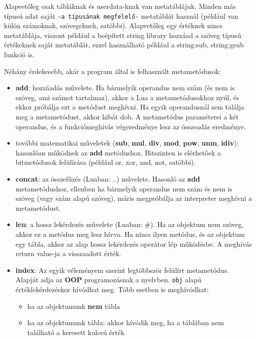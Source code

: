 Alapvetőleg csak tábláknak és userdata-knak van metatáblájuk. Minden más típusú adat saját \texttt{-a típusának megfelelő-} metatáblát használ (például van külön számoknak, szövegeknek, satöbbi). Alapvetőleg egy értéknek nincs metatáblája, viszont például a beépített string library hozzáad a szöveg típusú értékeknek saját metatáblát, ezzel használható például a string:sub, string:gsub funkció is.

Néhány érdekesebb, akár a program által is felhasznált metametódusok:
\begin{itemize}
	\item \detokenize{__}\textbf{add}: hozzáadás művelete. Ha bármelyik operandus nem szám (és nem is szöveg, ami számot tartalmaz), akkor a Lua a metametódusokhoz nyúl, és ekkor próbálja ezt a metódust meghívni. Ha egyik operandusnál sem találja meg a metametódust, akkor hibát dob. A metametódus paraméterei a két operandus, és a funkciómeghívás végeredménye lesz az összeadás eredménye.
	\item további matematikai műveletek (\detokenize{__}\textbf{sub}, \detokenize{__}\textbf{mul}, \detokenize{__}\textbf{div}, \detokenize{__}\textbf{mod}, \detokenize{__}\textbf{pow}, \detokenize{__}\textbf{unm}, \detokenize{__}\textbf{idiv}): hasonlóan működnek az \detokenize{__}\textbf{add} metódushoz. Bitszinten is elérhetőek a bitmetódusok felülírása (például or, xor, and, not, satöbbi).
	\item \detokenize{__}\textbf{concat}: az összefűzés (Luaban: ..) művelete. Hasonló az \detokenize{__}\textbf{add} metametódushoz, ellenben ha bármelyik operandus nem szám és nem is szöveg (vagy szám alapú szöveg), máris megpróbálja az interpreter meghívni a metametódust.
	\item \detokenize{__}\textbf{len}: a hossz lekérdezés művelete (Luaban: \#). Ha az objektum nem szöveg, akkor ez a metódus meg lesz hívva. Ha nincs ilyen metódus, és az objektum egy tábla, akkor az alap hossz lekérdezés operátor lép működésbe. A meghívás return value-ja a visszaadott érték.
	\pagebreak
	\item \detokenize{__}\textbf{index}: Az egyik véleményem szerint legtöbbször felülírt metametódus. Alapját adja az \textbf{OOP} programozásnak a nyelvben. \texttt{obj}\detokenize{[key]} alapú értéklekérdezéskor hívódhat meg. Több esetben is meghívódhat:
		\begin{itemize}
			\item ha az objektumunk \textbf{nem} tábla
			\item ha az objektumunk tábla: akkor hívódik meg, ha a táblában nem található a keresett kulcsú érték

\end{itemize}
\end{itemize}
